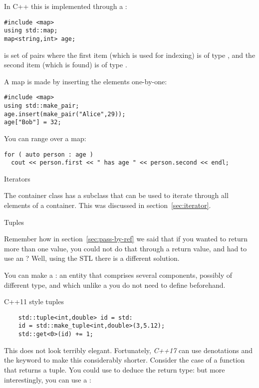 In C++ this is implemented through a :
\begin{verbatim}
#include <map>
using std::map;
map<string,int> age;
\end{verbatim}
is set of
pairs where the first item (which is used for indexing) is of type
, and the second item (which is found) is of type .

A map is made by inserting the elements one-by-one:
\begin{verbatim}
#include <map>
using std::make_pair;
age.insert(make_pair("Alice",29));
age["Bob"] = 32;
\end{verbatim}

You can range over a map:
\begin{verbatim}
for ( auto person : age )
  cout << person.first << " has age " << person.second << endl;
\end{verbatim}

 {Iterators}

The container class has a subclass  that can be
used to iterate through all elements of a container. This was
discussed in section~\ref{sec:iterator}.

 {Tuples}
\label{sec:tuple}

Remember how in section~\ref{sec:pass-by-ref} we said that if you
wanted to return more than one value, you could not do that through a
return value, and had to use an ?
Well, using the \ac{STL} there is a different solution.

You can make a : an entity that comprises several
components, possibly of different type, and which unlike a
 you do not need to define beforehand.

\begin{block}{C++11 style tuples}
  \label{sl:tuple11}
  \begin{lstlisting}
    std::tuple<int,double> id = std:
    id = std::make_tuple<int,double>(3,5.12);
    std::get<0>(id) += 1;
  \end{lstlisting}
\end{block}

This does not look terribly elegant. Fortunately,
\emph{C++17} can use denotations and the 
keyword to make this considerably shorter. Consider the case of a
function that returns a tuple. You could use  to deduce the
return type:
%
%
but more interestingly, you can use a
:
%


